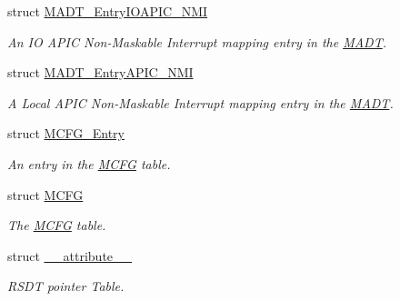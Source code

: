 \begin{DoxyCompactItemize}
struct \hyperlink{structMADT__EntryIOAPIC__NMI}{M\+A\+D\+T\+\_\+\+Entry\+I\+O\+A\+P\+I\+C\+\_\+\+N\+MI}
\begin{DoxyCompactList}\small\item\em An IO A\+P\+IC Non-\/\+Maskable Interrupt mapping entry in the \hyperlink{structMADT}{M\+A\+DT}. \end{DoxyCompactList}\item 
struct \hyperlink{structMADT__EntryAPIC__NMI}{M\+A\+D\+T\+\_\+\+Entry\+A\+P\+I\+C\+\_\+\+N\+MI}
\begin{DoxyCompactList}\small\item\em A Local A\+P\+IC Non-\/\+Maskable Interrupt mapping entry in the \hyperlink{structMADT}{M\+A\+DT}. \end{DoxyCompactList}\item 
struct \hyperlink{structMCFG__Entry}{M\+C\+F\+G\+\_\+\+Entry}
\begin{DoxyCompactList}\small\item\em An entry in the \hyperlink{structMCFG}{M\+C\+FG} table. \end{DoxyCompactList}\item 
struct \hyperlink{structMCFG}{M\+C\+FG}
\begin{DoxyCompactList}\small\item\em The \hyperlink{structMCFG}{M\+C\+FG} table. \end{DoxyCompactList}\item 
struct \hyperlink{struct____attribute____}{\+\_\+\+\_\+attribute\+\_\+\+\_\+}
\begin{DoxyCompactList}\small\item\em R\+S\+DT pointer Table. \end{DoxyCompactList}\end{DoxyCompactItemize}
